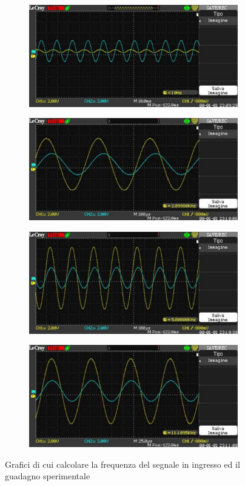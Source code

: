 \documentclass[a4paper, 12pt, twoside]{report}
\begin{document}
\begin{figure}[H]
	\centering
	\begin{subfigure}{.7\textwidth}
		\centering
		\includegraphics[width=.7\linewidth]{imag/WA000019}
		\caption{}
		\label{fig:wa000019}
	\end{subfigure}
	\hfill
	\begin{subfigure}{.7\textwidth}
		\centering
		\includegraphics[width=.7\linewidth]{imag/WA000020}
		\caption{}
		\label{fig:wa000020}
	\end{subfigure}
	\hfill
	\begin{subfigure}{.7\textwidth}
		\centering
		\includegraphics[width=.7\linewidth]{imag/WA000021}
		\caption{}
		\label{fig:wa000021}
	\end{subfigure}
	\hfill
	\begin{subfigure}{.7\textwidth}
		\centering
		\includegraphics[width=.7\linewidth]{imag/WA000022}
		\caption{}
		\label{fig:wa000022}
	\end{subfigure}
	\caption{Grafici di cui calcolare la frequenza del segnale in ingresso ed il guadagno sperimentale}
\end{figure}
\newpage
\end{document}
